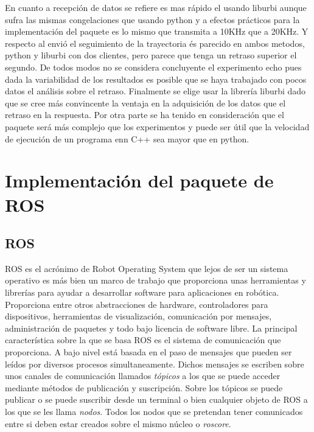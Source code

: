 \documentclass[12pt,a4paper,final,twoside]{book}
\begin{document}
En cuanto a recepción de datos se refiere es mas rápido el usando liburbi aunque sufra las mismas congelaciones que usando python y a efectos prácticos para la implementación del paquete es lo mismo que transmita a 10KHz que a 20KHz. Y respecto al envió el seguimiento de la trayectoria és parecido en ambos metodos, python y liburbi con dos clientes, pero parece que tenga un retraso superior el segundo. De todos modos no se considera concluyente el experimento echo pues dada la variabilidad de los resultados es posible que se haya trabajado con pocos datos el análisis sobre el retraso. Finalmente se elige usar la librería liburbi dado que se cree más convincente la ventaja en la adquisición de los datos que el retraso en la respuesta. Por otra parte se ha tenido en consideración que el paquete será más complejo que los experimentos y puede ser útil que la velocidad de ejecución de un programa enn C++ sea mayor que en python.

\newpage
\chapter{Implementación del paquete de ROS}
\thispagestyle{fancy}
\section{ROS}
\label{ros}
ROS es el acrónimo de Robot Operating System que lejos de ser un sistema operativo es más bien un marco de trabajo que proporciona unas herramientas y librerías para ayudar a desarrollar software para aplicaciones en robótica. Proporciona entre otros abstracciones de hardware, controladores para dispositivos, herramientas de visualización, comunicación por mensajes, administración de paquetes y todo bajo licencia de software libre.
La principal característica sobre la que se basa ROS es el sistema de comunicación que proporciona. A bajo nivel está basada en el paso de mensajes que pueden ser leídos por diversos procesos simultaneamente. Dichos mensajes se escriben sobre unos canales de comunicación llamados \textit{tópicos} a los que se puede acceder mediante métodos de publicación y suscripción. Sobre los tópicos se puede publicar o se puede suscribir desde un terminal o bien cualquier objeto de ROS a los que se les llama \textit{nodos}. Todos los nodos que se pretendan tener comunicados entre si deben estar creados sobre el mismo núcleo o \textit{roscore}.
\end{document}
